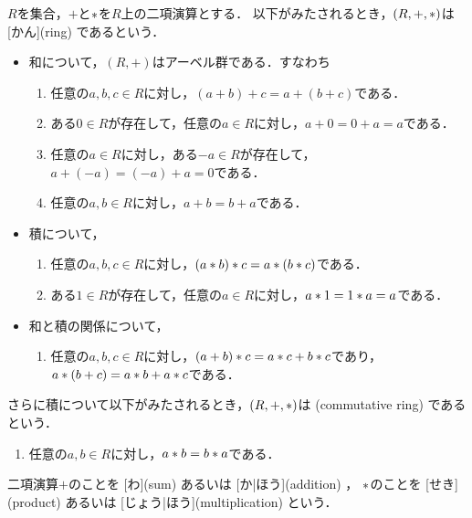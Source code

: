 \documentclass[../sotsu.tex]{subfiles}
\begin{document}
\begin{definition}[環]
    \label{dfn:ring}
    $R$を集合，$+$と$\mathbin{\ast}$を$R$上の二項演算とする．
    以下がみたされるとき，$(R, +, \mathbin{\ast})$は%
    [かん](ring)%
    であるという．
    \begin{itemize}
        \item 和について，$(R, +)$はアーベル群である．すなわち
        \begin{enumerate}
            \item \label{ring:sum-associative} 任意の$a, b, c \in R$に対し，$(a + b) + c = a + (b + c)$である．
            \item \label{ring:sum-zero} ある$0 \in R$が存在して，任意の$a \in R$に対し，$a + 0 = 0 + a = a$である．
            \item \label{ring:sum-opposite} 任意の$a \in R$に対し，ある$-a \in R$が存在して，$a + (-a) = (-a) + a = 0$である．
            \item \label{ring:sum-commutative} 任意の$a, b \in R$に対し，$a + b = b + a$である．
        \end{enumerate}
        \item 積について，
        \begin{enumerate}[resume]
            \item \label{ring:prod-associative} 任意の$a, b, c \in R$に対し，$(a \mathbin{\ast} b) \mathbin{\ast} c = a \mathbin{\ast} (b \mathbin{\ast} c)$である．
            \item \label{ring:prod-one} ある$1 \in R$が存在して，任意の$a \in R$に対し，$a \mathbin{\ast} 1 = 1 \mathbin{\ast} a = a$である．
        \end{enumerate}
        \item 和と積の関係について，
        \begin{enumerate}[resume]
            \item \label{ring:distributive} 任意の$a, b, c \in R$に対し，$(a + b) \mathbin{\ast} c = a \mathbin{\ast} c + b \mathbin{\ast} c$であり，$a \mathbin{\ast} (b + c) = a \mathbin{\ast} b + a \mathbin{\ast} c$である．
        \end{enumerate}
    \end{itemize}
    さらに積について以下がみたされるとき，$(R, +, \mathbin{\ast})$は%
    (commutative ring)%
    であるという．
    \begin{enumerate}[start=9]
        \item 任意の$a, b \in R$に対し，$a \mathbin{\ast} b = b \mathbin{\ast} a$である．
    \end{enumerate}
    二項演算$+$のことを%
    [わ](sum)%
    あるいは%
    [か|ほう](addition)%
    ，
    $\mathbin{\ast}$のことを%
    [せき](product)%
    あるいは%
    [じょう|ほう](multiplication)%
    という．
\end{definition}
\end{document}
